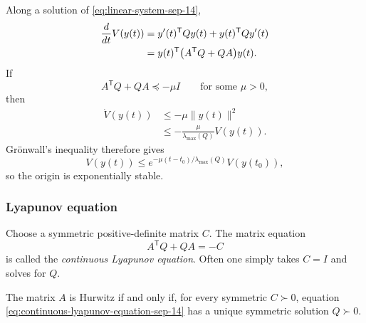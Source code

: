 Along a solution of \eqref{eq:linear-system-sep-14},
\begin{align}
  \frac{d}{dt}V(y(t))
  &=y'(t)^{\mathsf T}Qy(t)+y(t)^{\mathsf T}Qy'(t)\notag\\
  &=y(t)^{\mathsf T}\bigl(A^{\mathsf T}Q+QA\bigr)y(t).
  \label{eq:quadratic-lyapunov-derivative-sep-14}
\end{align}
If
\[
  A^{\mathsf T}Q+QA\preceq-\mu I
  \qquad\text{for some }\mu>0,
\]
then
\begin{align*}
  \dot V(y(t))
  &\leq-\mu\lVert y(t)\rVert^2\\
  &\leq-\frac{\mu}{\lambda_{\max}(Q)}V(y(t)).
\end{align*}
Gr\"onwall's inequality therefore gives
\begin{equation}\label{eq:quadratic-decay-sep-14}
  V(y(t))
  \leq
  e^{-\mu(t-t_0)/\lambda_{\max}(Q)}V(y(t_0)),
\end{equation}
so the origin is exponentially stable.

\subsubsection{Lyapunov equation}

Choose a symmetric positive-definite matrix \(C\). The matrix equation
\begin{equation}\label{eq:continuous-lyapunov-equation-sep-14}
  A^{\mathsf T}Q+QA=-C
\end{equation}
is called the \emph{continuous Lyapunov equation}. Often one simply
takes \(C=I\) and solves for \(Q\).

\begin{theorem}
  The matrix \(A\) is Hurwitz if and only if, for every symmetric
  \(C\succ0\), equation
  \eqref{eq:continuous-lyapunov-equation-sep-14} has a unique symmetric
  solution \(Q\succ0\).
\end{theorem}

